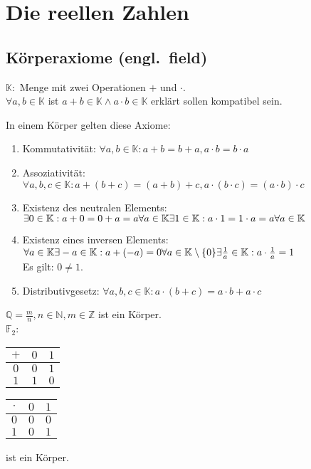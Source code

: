 \documentclass[../ana1.tex]{subfiles}
\begin{document}
\setcounter{section}{2}

\section{Die reellen Zahlen}
\subsection{Körperaxiome (engl.\ field)}
\(\mathbb{K:}\) Menge mit zwei Operationen \glqq{}\(+\)\grqq{} und \glqq{}\(\cdot \)\grqq{}.\\
\(\forall a,b \in \mathbb{K}\) ist \(a+b\in \mathbb{K} \wedge a\cdot b \in \mathbb{K}\) erklärt sollen kompatibel sein.
\begin{defi}[Körperaxiome]
	In einem Körper gelten diese Axiome:
	\begin{enumerate}
		\item Kommutativität: \(\forall a,b\in \mathbb{K}: a+b=b+a, a\cdot b=b\cdot a\)
		\item Assoziativität: \(\forall a,b,c\in \mathbb{K}: a+(b+c) = (a+b)+c, a\cdot (b\cdot c) = (a\cdot b)\cdot c\)
		\item Existenz des neutralen Elements: \\
		      \(\exists 0 \in \mathbb{K}: a + 0 = 0 + a = a \forall a\in \mathbb{K}\\
			      \exists 1 \in \mathbb{K}: a \cdot 1 = 1 \cdot a = a \forall a\in\mathbb{K}\)
		\item Existenz eines inversen Elements:\\
		      \(\forall a\in\mathbb{K}\exists -a\in\mathbb{K}:a+ (-a)=0\\
			      \forall a\in\mathbb{K} \setminus \{0\} \exists \frac{1}{a}\in\mathbb{K}:a\cdot\frac{1}{a}=1\) \\
		      Es gilt: \(0\neq1\).
		\item Distributivgesetz: \(\forall a,b,c\in\mathbb{K}:a\cdot(b+c)=a\cdot b + a \cdot c\)
	\end{enumerate}
\end{defi}
\begin{bsp}
	\(\mathbb{Q} = \frac{m}{n}, n \in \mathbb{N}, m\in\mathbb{Z}\) ist ein Körper.\\
	\(\mathbb{F}_2\):
	\begin{tabular}{c|cc}
		\(+\) & \(0\) & \(1\) \\
		\hline
		\(0\) & \(0\) & \(1\) \\
		\(1\) & \(1\) & \(0\)
	\end{tabular}
	\begin{tabular}{c|cc}
		\(\cdot \) & \(0\) & \(1\) \\
		\hline
		\(0\)     & \(0\) & \(0\) \\
		\(1\)     & \(0\) & \(1\)
	\end{tabular}
	ist ein Körper.
\end{bsp}
\end{document}
